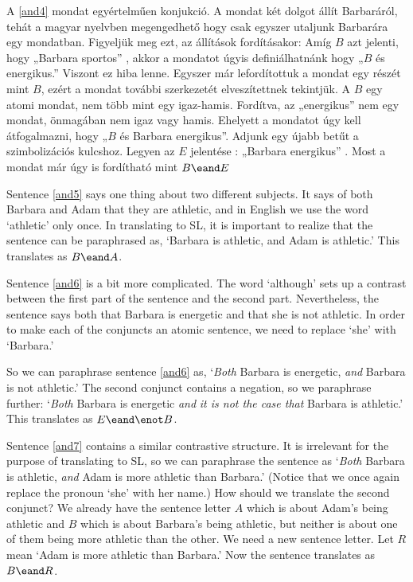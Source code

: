 A \ref{and4} mondat egyértelműen konjukció. 
A mondat két dolgot állít Barbaráról, tehát a magyar nyelvben megengedhető hogy csak egyszer utaljunk Barbarára egy mondatban.
Figyeljük meg ezt, az állítások fordításakor: Amíg $B$ azt jelenti, hogy „Barbara sportos” ,  akkor a mondatot úgyis definiálhatnánk hogy „$B$ és energikus.” 
Viszont ez hiba lenne. 
Egyszer már lefordítottuk a mondat egy részét mint $B$, ezért a mondat további szerkezetét elveszítettnek tekintjük.
A $B$ egy atomi mondat, nem több mint egy igaz-hamis. 
Fordítva, az „energikus” nem egy mondat, önmagában nem igaz vagy hamis. 
Ehelyett a mondatot úgy kell átfogalmazni, hogy „$B$ és Barbara energikus”.
Adjunk egy újabb betűt a szimbolizációs kulcshoz. 
Legyen az $E$ jelentése : „Barbara energikus” .
Most a mondat már úgy is fordítható mint $B\eand E$



Sentence \ref{and5} says one thing about two different subjects. It says of both Barbara and Adam that they are athletic, and in English we use the word `athletic' only once. In translating to SL, it is important to realize that the sentence can be paraphrased as, `Barbara is athletic, and Adam is athletic.' This translates as $B\eand A$.

Sentence \ref{and6} is a bit more complicated. The word `although' sets up a contrast between the first part of the sentence and the second part. Nevertheless, the sentence says both that Barbara is energetic and that she is not athletic. In order to make each of the conjuncts an atomic sentence, we need to replace `she' with `Barbara.'

So we can paraphrase sentence \ref{and6} as, `\emph{Both} Barbara is energetic, \emph{and} Barbara is not athletic.' The second conjunct contains a negation, so we paraphrase further: `\emph{Both} Barbara is energetic \emph{and} \emph{it is not the case that} Barbara is athletic.' This translates as $E\eand\enot B$.

Sentence \ref{and7} contains a similar contrastive structure. It is irrelevant for the purpose of translating to SL, so we can paraphrase the sentence as `\emph{Both} Barbara is athletic, \emph{and} Adam is more athletic than Barbara.' (Notice that we once again replace the pronoun `she' with her name.) How should we translate the second conjunct? We already have the sentence letter $A$ which is about Adam's being athletic and $B$ which is about Barbara's being athletic, but neither is about one of them being more athletic than the other. We need a new sentence letter. Let $R$ mean `Adam is more athletic than Barbara.' Now the sentence translates as $B\eand R$.

